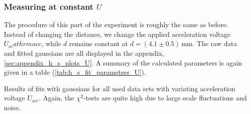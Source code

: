 \subsubsection{Measuring at constant $U$}
The procedure of this part of the experiment is roughly the same as before. 
Instead of changing the distance, we change the applied acceleration voltage 
$U_mathrm{acc}$, while $d$ remains constant at $d = (4.1 \pm 0.5)\,$mm. 
The raw data and fitted gaussians are all displayed in the appendix,
\ref{sec:appendix_h_s_plots_U}. A summary of the calculated parameters is 
again given in a table (\ref{tab:h_s_fit_parameters_U}). 
\renewcommand{\arraystretch}{1.5}
\begin{table}[htdp]
    \centering
    \caption{
        Results of fits with gaussians for all used data sets with variating 
        acceleration voltage
        $U_\mathrm{acc}$. Again, the $\chi^2$-tests are quite high due to 
        large scale fluctuations and noise. 
        }
    
    \label{tab:h_s_fit_parameters_U}
\end{table}

